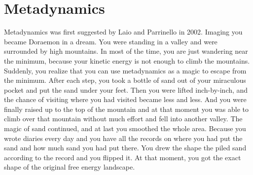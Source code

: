 \section{Metadynamics\label{Sec:ES:metadynamics}}
Metadynamics was first suggested by Laio and Parrinello in 2002.\cite{LaioPNAS2002} Imaging you became Doraemon in a dream. You were standing in a valley and were surrounded by high mountains. In most of the time, you are just wandering near the minimum, because your kinetic energy is not enough to climb the mountains. Suddenly, you realize that you can use metadynamics as a magic to escape from the minimum. After each step, you took a bottle of sand out of your miraculous pocket and put the sand under your feet. Then you were lifted inch-by-inch, and the chance of visiting where you had visited became less and less. And you were finally raised up to the top of the mountain and at that moment you was able to climb over that mountain without much effort and fell into another valley. The magic of sand continued, and at last you smoothed the whole area. Because you wrote diaries every day and you have all the records on where you had put the sand and how much sand you had put there. You drew the shape the piled sand according to the record and you flipped it. At that moment, you got the exact shape of the original free energy landscape. 
